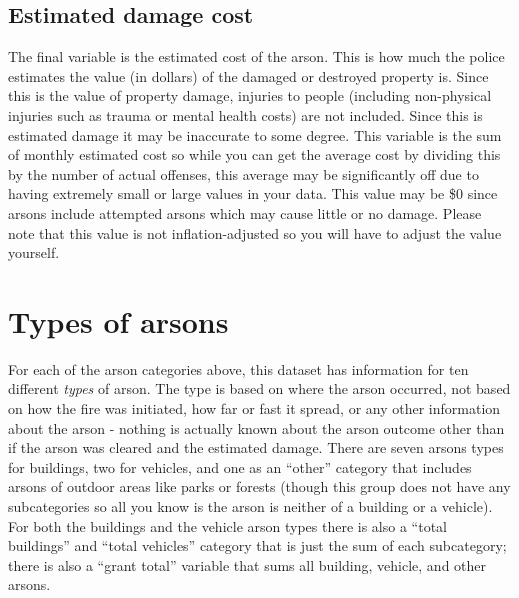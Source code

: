 \documentclass[
  12pt,
  openany]{book}
\begin{document}
\hypertarget{estimated-damage-cost}{%
\subsection{Estimated damage cost}\label{estimated-damage-cost}}

The final variable is the estimated cost of the arson. This is how much the police estimates the value (in dollars) of the damaged or destroyed property is. Since this is the value of property damage, injuries to people (including non-physical injuries such as trauma or mental health costs) are not included. Since this is estimated damage it may be inaccurate to some degree. This variable is the sum of monthly estimated cost so while you can get the average cost by dividing this by the number of actual offenses, this average may be significantly off due to having extremely small or large values in your data. This value may be \$0 since arsons include attempted arsons which may cause little or no damage. Please note that this value is not inflation-adjusted so you will have to adjust the value yourself.

\hypertarget{arsonType}{%
\section{Types of arsons}\label{arsonType}}

For each of the arson categories above, this dataset has information for ten different \emph{types} of arson. The type is based on where the arson occurred, not based on how the fire was initiated, how far or fast it spread, or any other information about the arson - nothing is actually known about the arson outcome other than if the arson was cleared and the estimated damage. There are seven arsons types for buildings, two for vehicles, and one as an ``other'' category that includes arsons of outdoor areas like parks or forests (though this group does not have any subcategories so all you know is the arson is neither of a building or a vehicle). For both the buildings and the vehicle arson types there is also a ``total buildings'' and ``total vehicles'' category that is just the sum of each subcategory; there is also a ``grant total'' variable that sums all building, vehicle, and other arsons.
\end{document}
